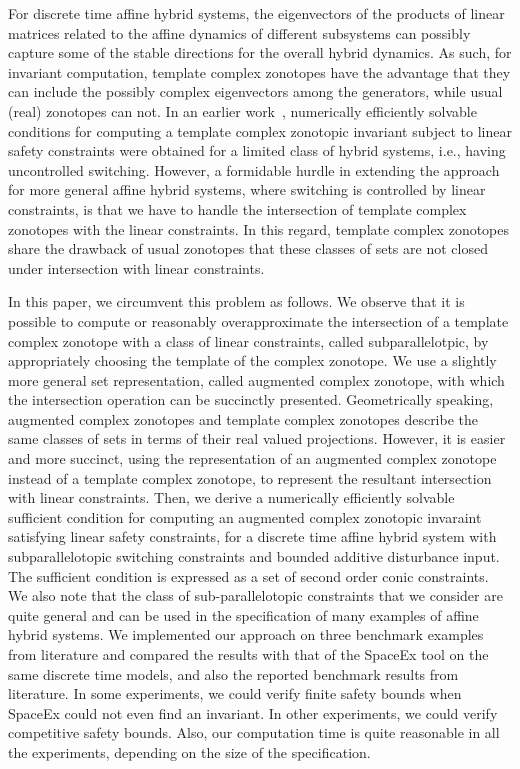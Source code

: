 

For discrete time affine hybrid systems, the eigenvectors of the
products of linear matrices related to the affine dynamics of
different subsystems can possibly capture some of the stable
directions for the overall hybrid dynamics.  As such, for invariant
computation, template complex zonotopes have the advantage that they
can include the possibly complex eigenvectors among the generators,
while usual (real) zonotopes can not.  In an earlier
work~\cite{tcz2017}, numerically efficiently solvable conditions for
computing a template complex zonotopic invariant subject to linear
safety constraints were obtained for a limited class of hybrid
systems, i.e., having uncontrolled switching.  However, a formidable
hurdle in extending the approach for more general affine hybrid
systems, where switching is controlled by linear constraints, is that
we have to handle the intersection of template complex zonotopes with
the linear constraints.  In this regard, template complex zonotopes
share the drawback of usual zonotopes that these classes of sets are
not closed under intersection with linear constraints.

In this paper, we circumvent this problem as follows.  We observe that
it is possible to compute or reasonably overapproximate the
intersection of a template complex zonotope with a class of linear
constraints, called subparallelotpic, by appropriately choosing the
template of the complex zonotope.  We use a slightly more general set
representation, called augmented complex zonotope, with which the
intersection operation can be succinctly presented.  Geometrically
speaking, augmented complex zonotopes and template complex zonotopes
describe the same classes of sets in terms of their real valued
projections.  However, it is easier and more succinct, using the
representation of an augmented complex zonotope instead of a template
complex zonotope, to represent the resultant intersection with linear
constraints.  Then, we derive a numerically efficiently solvable
sufficient condition for computing an augmented complex zonotopic
invaraint satisfying linear safety constraints, for a discrete time
affine hybrid system with subparallelotopic switching constraints and
bounded additive disturbance input.  The sufficient condition is
expressed as a set of second order conic constraints.  We also note
that the class of sub-parallelotopic constraints that we consider are
quite general and can be used in the specification of many examples of 
affine hybrid systems.  We implemented our approach on three benchmark
examples from literature and compared the results with that of the
SpaceEx tool on the same discrete time models, and also the reported
benchmark results from literature.  In some experiments, we could
verify finite safety bounds when SpaceEx could not even find an
invariant. In other experiments, we could verify competitive safety
bounds.  Also, our computation time is quite reasonable in all the
experiments, depending on the size of the specification.

